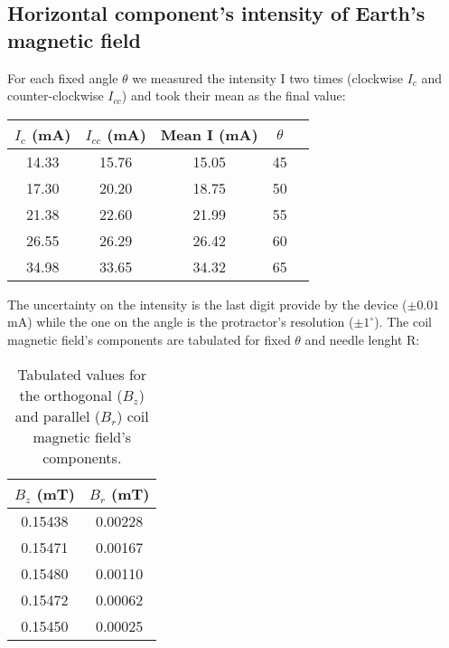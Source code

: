 \subsection{Horizontal component's intensity of Earth's magnetic field}
For each fixed angle $\theta$ we measured the intensity I two times (clockwise $I_c$ and counter-clockwise $I_{cc}$) and took their mean as the final value:
\begin{table}[H]
\centering
\begin{tabular}{|c|c|c|c|c|}
\hline
$I_c$ (mA) & $I_{cc}$ (mA) & Mean I (mA) & $\theta$ \\ \hline
14.33 & 15.76 & 15.05 & 45  \\ \hline
17.30 & 20.20 & 18.75 & 50  \\ \hline
21.38 & 22.60 & 21.99 & 55  \\ \hline
26.55 & 26.29 & 26.42 & 60  \\ \hline
34.98 & 33.65 & 34.32 & 65  \\ \hline
\end{tabular}
\end{table}
The uncertainty on the intensity is the last digit provide by the device ($\pm 0.01$ mA) while the one on the angle is the protractor's resolution ($\pm 1^{\circ}$).
The coil magnetic field's components are tabulated for fixed $\theta$ and needle lenght R:
\begin{table}[H]
\centering
\begin{tabular}{|c|c|}
\hline
$B_z$ (mT) & $B_r$ (mT)\\ \hline
0.15438 & 0.00228 \\ \hline
0.15471 & 0.00167 \\ \hline
0.15480 & 0.00110 \\ \hline
0.15472 & 0.00062 \\ \hline
0.15450 & 0.00025 \\ \hline
\end{tabular}
\caption{Tabulated values for the orthogonal ($B_z$) and parallel ($B_r$) coil magnetic field's components.}
\end{table}

